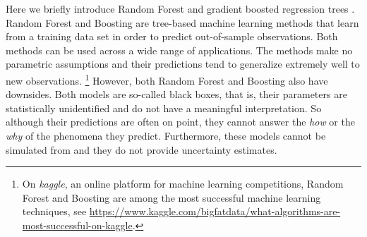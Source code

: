 \documentclass[a4paper,usenames,dvipsnames]{article}
\newenvironment{revision}{\color{teal}}{\color{black}}
\begin{document}
\begin{revision}
Here we briefly introduce Random Forest \cite{breiman2001random} and gradient boosted regression trees \cite{Friedman2001greedy}.
Random Forest and Boosting are tree-based machine learning methods that learn from a training data set in order to predict out-of-sample observations.
Both methods can be used across a wide range of applications.
The methods make no parametric assumptions and their predictions tend to generalize extremely well to new observations.%
\footnote{\begin{revision}On \emph{kaggle}, an online platform for machine learning competitions, Random Forest and Boosting are among the most successful machine learning techniques, see \url{https://www.kaggle.com/bigfatdata/what-algorithms-are-most-successful-on-kaggle}.\end{revision}}
However, both Random Forest and Boosting also have downsides.
Both models are so-called black boxes, that is, their parameters are statistically unidentified and do not have a meaningful interpretation.
So although their predictions are often on point, they cannot answer the \emph{how} or the \emph{why} of the phenomena they predict. Furthermore, these models cannot be simulated from and they do not provide uncertainty estimates.%
\end{revision}
\end{document}
